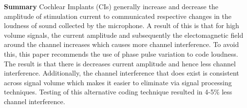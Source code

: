 \noindent
\textbf{Summary} Cochlear Implants (CIs) generally increase and decrease the amplitude of stimulation current to communicated respective changes in the loudness of sound collected by the microphone. A result of this is that for high volume signals, the current amplitude and subsequently the electomagnetic field around the channel increases which causes more channel interference. To avoid this, this paper recommends the use of phase pulse variation to code loudness. The result is that there is decreases current amplitude and hence less channel interference. Additionally, the channel interference that does exist is consistent across signal volume which makes it easier to eliminate via signal processing techniques. Testing of this alternative coding technique resulted in 4-5\% less channel interference.  \\ \\